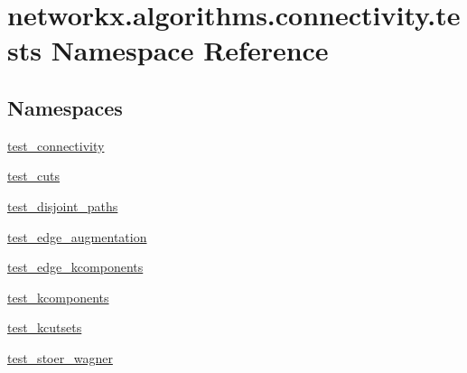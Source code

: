 \hypertarget{namespacenetworkx_1_1algorithms_1_1connectivity_1_1tests}{}\section{networkx.\+algorithms.\+connectivity.\+tests Namespace Reference}
\label{namespacenetworkx_1_1algorithms_1_1connectivity_1_1tests}
\subsection*{Namespaces}
\begin{DoxyCompactItemize}
\item 
 \hyperlink{namespacenetworkx_1_1algorithms_1_1connectivity_1_1tests_1_1test__connectivity}{test\+\_\+connectivity}
\item 
 \hyperlink{namespacenetworkx_1_1algorithms_1_1connectivity_1_1tests_1_1test__cuts}{test\+\_\+cuts}
\item 
 \hyperlink{namespacenetworkx_1_1algorithms_1_1connectivity_1_1tests_1_1test__disjoint__paths}{test\+\_\+disjoint\+\_\+paths}
\item 
 \hyperlink{namespacenetworkx_1_1algorithms_1_1connectivity_1_1tests_1_1test__edge__augmentation}{test\+\_\+edge\+\_\+augmentation}
\item 
 \hyperlink{namespacenetworkx_1_1algorithms_1_1connectivity_1_1tests_1_1test__edge__kcomponents}{test\+\_\+edge\+\_\+kcomponents}
\item 
 \hyperlink{namespacenetworkx_1_1algorithms_1_1connectivity_1_1tests_1_1test__kcomponents}{test\+\_\+kcomponents}
\item 
 \hyperlink{namespacenetworkx_1_1algorithms_1_1connectivity_1_1tests_1_1test__kcutsets}{test\+\_\+kcutsets}
\item 
 \hyperlink{namespacenetworkx_1_1algorithms_1_1connectivity_1_1tests_1_1test__stoer__wagner}{test\+\_\+stoer\+\_\+wagner}
\end{DoxyCompactItemize}
